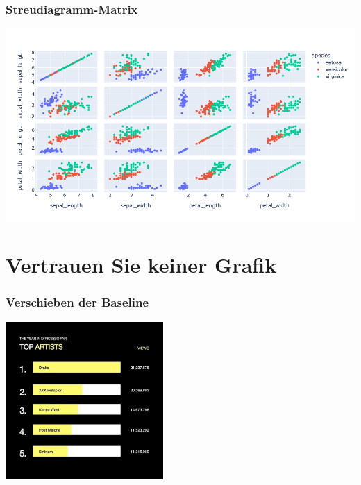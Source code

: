 \begin{frame}
\frametitle{Streudiagramm-Matrix}

\begin{center}
\includegraphics[width=\linewidth]{fig5/matrix2.png}
\end{center}
\end{frame}



\section{Vertrauen Sie keiner Grafik}


%


\begin{frame}
\frametitle{Verschieben der Baseline}

\vfill
\begin{center}
	\includegraphics[height=60mm]{fig5/error-baseline1.jpg} \\
	\scriptsize {}
\end{center}
\vfill
\end{frame}


